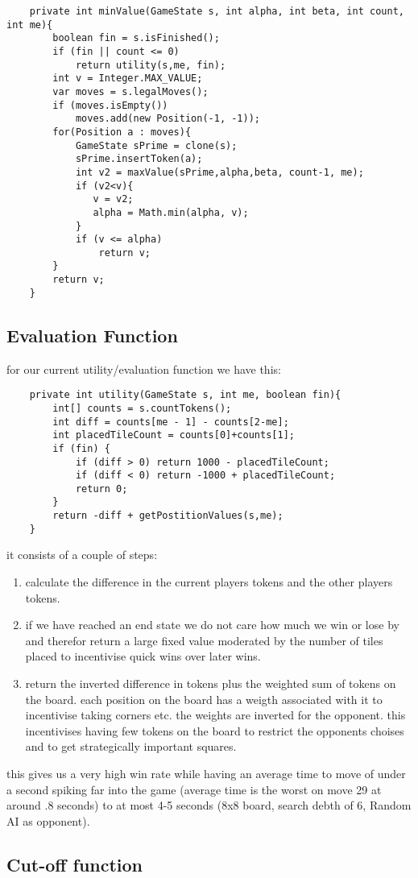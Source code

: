\documentclass{article}
\begin{document}
\begin{verbatim}
    private int minValue(GameState s, int alpha, int beta, int count, int me){
        boolean fin = s.isFinished();
        if (fin || count <= 0) 
            return utility(s,me, fin);
        int v = Integer.MAX_VALUE;
        var moves = s.legalMoves();
        if (moves.isEmpty())
            moves.add(new Position(-1, -1));
        for(Position a : moves){
            GameState sPrime = clone(s);
            sPrime.insertToken(a);
            int v2 = maxValue(sPrime,alpha,beta, count-1, me);
            if (v2<v){
               v = v2;
               alpha = Math.min(alpha, v);
            }
            if (v <= alpha) 
                return v;
        }
        return v;
    }

\end{verbatim}

\subsection{Evaluation Function}

for our current utility/evaluation function we have this:
\begin{verbatim}
    private int utility(GameState s, int me, boolean fin){
        int[] counts = s.countTokens();
        int diff = counts[me - 1] - counts[2-me];
        int placedTileCount = counts[0]+counts[1];
        if (fin) {
            if (diff > 0) return 1000 - placedTileCount;
            if (diff < 0) return -1000 + placedTileCount;
            return 0;
        }
        return -diff + getPostitionValues(s,me);
    }
\end{verbatim}
it consists of a couple of steps:
\begin{enumerate}
    \item calculate the difference in the current players tokens and the other players tokens.
    \item if we have reached an end state we do not care how much we win or lose 
          by and therefor return a large fixed value moderated by the number 
          of tiles placed to incentivise quick wins over later wins.
    \item return the inverted difference in tokens plus the weighted sum of tokens on the board.
          each position on the board has a weigth associated with it to incentivise
          taking corners etc. the weights are inverted for the opponent. this
          incentivises having few tokens on the board to restrict the opponents
          choises and to get strategically important squares.
\end{enumerate}
this gives us a very high win rate while having an average time to move of 
under a second spiking far into the game (average time is the worst on move 29 at around .8 seconds) to at most 4-5 seconds (8x8 board, search debth of 6, Random AI as opponent).



\subsection{Cut-off function}
\end{document}
